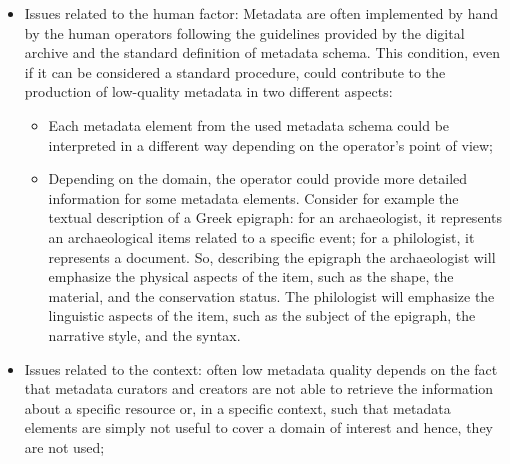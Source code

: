 \documentclass[epsfig,a4paper,12pt,titlepage]{book}
\begin{document}
\begin{itemize}
    \item Issues related to the human factor: Metadata are often implemented by hand by the human operators following the guidelines provided by the digital archive and the standard definition of metadata schema. This condition, even if it can be considered a standard procedure, could contribute to the production of low-quality metadata in two different aspects:
    \begin{itemize}
        \item Each metadata element from the used metadata schema could be interpreted in a different way depending on the operator's point of view;
        \item Depending on the domain, the operator could provide more detailed information for some metadata elements.  Consider for example  the textual description of a Greek epigraph: for an archaeologist, it represents an archaeological items related to a specific event; for a philologist, it represents a document. So, describing the epigraph the archaeologist will emphasize the physical aspects of the item, such as the shape, the material, and the conservation status. The philologist will emphasize the linguistic aspects of the item, such as the subject of the epigraph, the narrative style, and the syntax. 
    \end{itemize}
\item Issues related to the context: often low metadata quality depends on the fact that metadata curators and creators are not able to retrieve the information about a specific resource or, in a specific context, such that metadata elements are simply not useful to cover a domain of interest and hence, they are not used;   
   

\end{itemize}
\end{document}
